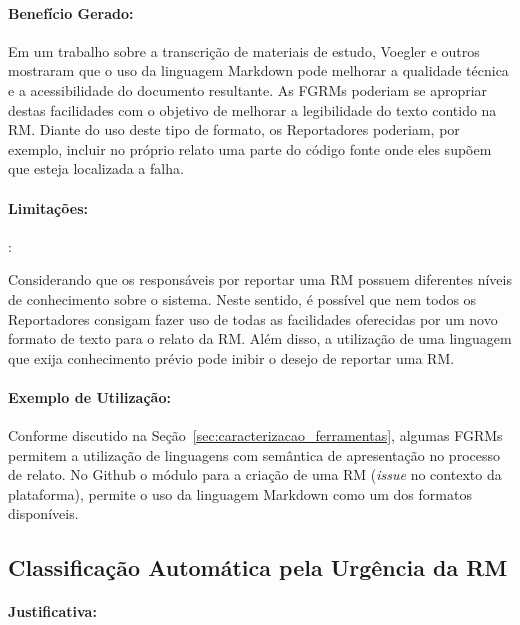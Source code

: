 \paragraph{Benefício Gerado:}\label{par:papéis_afetados_s06}

Em um trabalho sobre a transcrição de materiais de estudo, Voegler e
outros~\cite{voegler2014markdown} mostraram que o uso da linguagem Markdown pode
melhorar a qualidade técnica e a acessibilidade do documento resultante. As
FGRMs poderiam se apropriar destas facilidades com o objetivo de melhorar a
legibilidade do texto contido na RM\@. Diante do uso deste tipo de formato, os
Reportadores poderiam, por exemplo, incluir no próprio relato uma parte do
código fonte onde eles supõem que esteja localizada a falha.

\paragraph{Limitações:}:\label{par:limitacoes_s06}

Considerando que os responsáveis por reportar uma RM possuem diferentes níveis
de conhecimento sobre o sistema. Neste sentido, é possível que nem todos os
Reportadores consigam fazer uso de todas as facilidades oferecidas por um novo
formato de texto para o relato da RM\@. Além disso, a utilização de uma
linguagem que exija conhecimento prévio pode inibir o desejo de reportar uma
RM\@.

\paragraph{Exemplo de Utilização:}
\label{par:exemplo_de_utilização_s06}

Conforme discutido na Seção~\ref{sec:caracterizacao_ferramentas}, algumas FGRMs
permitem a utilização de linguagens com semântica de apresentação no processo de
relato. No Github o módulo para a criação de uma RM (\textit{issue} no contexto
da plataforma), permite o uso da linguagem Markdown como um dos formatos
disponíveis.

\subsection{Classificação Automática pela Urgência da RM}
\label{sub:priorizacao_automatica_rms}


\paragraph{Justificativa:}
\label{par:justificativa_s07}

